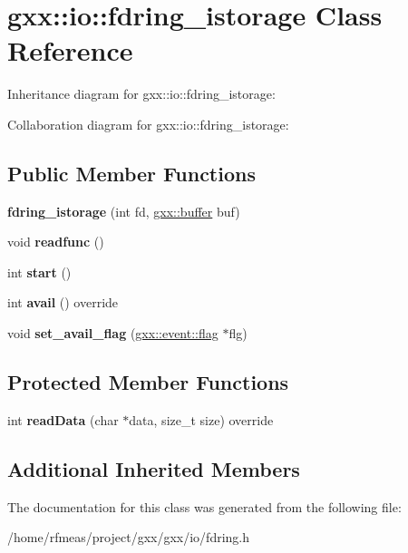 \hypertarget{classgxx_1_1io_1_1fdring__istorage}{}\section{gxx\+:\+:io\+:\+:fdring\+\_\+istorage Class Reference}
\label{classgxx_1_1io_1_1fdring__istorage}


Inheritance diagram for gxx\+:\+:io\+:\+:fdring\+\_\+istorage\+:


Collaboration diagram for gxx\+:\+:io\+:\+:fdring\+\_\+istorage\+:
\subsection*{Public Member Functions}
\begin{DoxyCompactItemize}
\item 
{\bfseries fdring\+\_\+istorage} (int fd, \hyperlink{classgxx_1_1buffer}{gxx\+::buffer} buf)\hypertarget{classgxx_1_1io_1_1fdring__istorage_a5b1f39549243b8bee41b58d8e09d159a}{}\label{classgxx_1_1io_1_1fdring__istorage_a5b1f39549243b8bee41b58d8e09d159a}

\item 
void {\bfseries readfunc} ()\hypertarget{classgxx_1_1io_1_1fdring__istorage_aee701c0dcf18efa358f8e1bece2c00d3}{}\label{classgxx_1_1io_1_1fdring__istorage_aee701c0dcf18efa358f8e1bece2c00d3}

\item 
int {\bfseries start} ()\hypertarget{classgxx_1_1io_1_1fdring__istorage_a0a09501fd3da0cb016e69d6af04142a5}{}\label{classgxx_1_1io_1_1fdring__istorage_a0a09501fd3da0cb016e69d6af04142a5}

\item 
int {\bfseries avail} () override\hypertarget{classgxx_1_1io_1_1fdring__istorage_aba9f24c5f3dc8c42ce75da8cf66d4f30}{}\label{classgxx_1_1io_1_1fdring__istorage_aba9f24c5f3dc8c42ce75da8cf66d4f30}

\item 
void {\bfseries set\+\_\+avail\+\_\+flag} (\hyperlink{classgxx_1_1event_1_1flag}{gxx\+::event\+::flag} $\ast$flg)\hypertarget{classgxx_1_1io_1_1fdring__istorage_a0b7fe9e4d05a159c83a4d028652ab31f}{}\label{classgxx_1_1io_1_1fdring__istorage_a0b7fe9e4d05a159c83a4d028652ab31f}

\end{DoxyCompactItemize}
\subsection*{Protected Member Functions}
\begin{DoxyCompactItemize}
\item 
int {\bfseries read\+Data} (char $\ast$data, size\+\_\+t size) override\hypertarget{classgxx_1_1io_1_1fdring__istorage_ae1dea4c50c0a451d8db1b24a91544a27}{}\label{classgxx_1_1io_1_1fdring__istorage_ae1dea4c50c0a451d8db1b24a91544a27}

\end{DoxyCompactItemize}
\subsection*{Additional Inherited Members}


The documentation for this class was generated from the following file\+:\begin{DoxyCompactItemize}
\item 
/home/rfmeas/project/gxx/gxx/io/fdring.\+h\end{DoxyCompactItemize}
